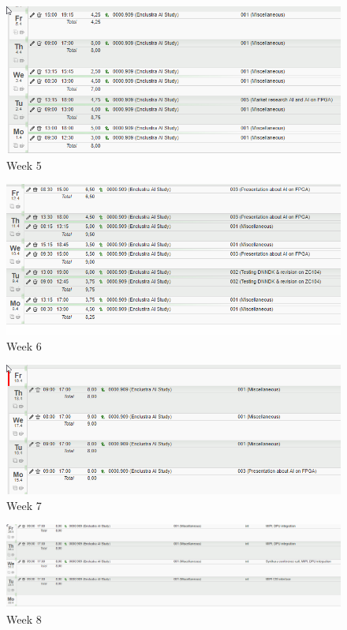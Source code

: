 \begin{figure}[!htb]
	\centering
		\includegraphics[width=\textwidth]{timetable/week5.png}
		\caption{Week 5}
\end{figure}

\begin{figure}[!htb]
	\centering
		\includegraphics[width=\textwidth]{timetable/week6.png}
		\caption{Week 6}
\end{figure}

\begin{figure}[!htb]
	\centering
		\includegraphics[width=\textwidth]{timetable/week7.png}
		\caption{Week 7}
\end{figure}

\begin{figure}[!htb]
	\centering
		\includegraphics[width=\textwidth]{timetable/week8.png}
		\caption{Week 8}
\end{figure}

